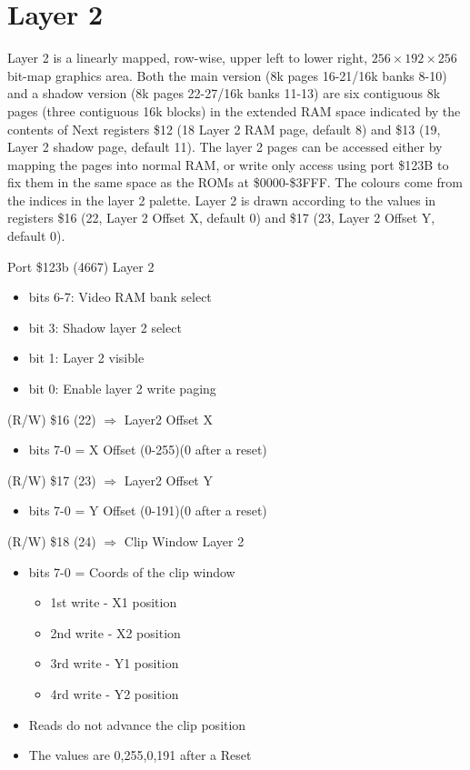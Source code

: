 \section{Layer 2}
Layer 2 is a linearly mapped, row-wise, upper left to lower right,
$256\times192\times256$ bit-map graphics area.  Both the main version
(8k pages 16-21/16k banks 8-10) and a shadow version (8k pages
22-27/16k banks 11-13) are six contiguous 8k pages (three contiguous
16k blocks) in the extended RAM space indicated by the contents of
Next registers \$12 (18 Layer 2 RAM page, default 8) and \$13 (19,
Layer 2 shadow page, default 11).  The layer 2 pages can be accessed
either by mapping the pages into normal RAM, or write only access
using port \$123B to fix them in the same space as the ROMs at
\$0000-\$3FFF.  The colours come from the indices in the layer 2
palette.  Layer 2 is drawn according to the values in registers \$16
(22, Layer 2 Offset X, default 0) and \$17 (23, Layer 2 Offset Y,
default 0).

Port \$123b (4667) Layer 2
\begin{itemize}
  \item bits 6-7: Video RAM bank select
  \item bit 3: Shadow layer 2 select
  \item bit 1: Layer 2 visible
  \item bit 0: Enable layer 2 write paging
\end{itemize}

(R/W) \$16 (22) $\Rightarrow$ Layer2 Offset X
\begin{itemize}
\item bits 7-0 = X Offset (0-255)(0 after a reset)
\end{itemize}

(R/W) \$17 (23) $\Rightarrow$ Layer2 Offset Y
\begin{itemize}
\item bits 7-0 = Y Offset (0-191)(0 after a reset)
\end{itemize}

(R/W) \$18 (24) $\Rightarrow$ Clip Window Layer 2
\begin{itemize}
\item bits 7-0 = Coords of the clip window
  \begin{itemize}
  \item 1st write - X1 position
  \item 2nd write - X2 position
  \item 3rd write - Y1 position
  \item 4rd write - Y2 position
  \end{itemize}
\item[] Reads do not advance the clip position
\item[] The values are 0,255,0,191 after a Reset
\end{itemize}

